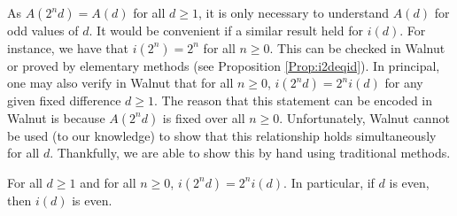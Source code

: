 \documentclass[10pt,a4paper,reqno]{amsart}
\newcommand{\walnut}{{\ttfamily Walnut}}
\newcommand{\true}{{\ttfamily TRUE}}
\begin{document}
As $A(2^nd)=A(d)$ for all $d \geq 1$, it is only necessary to understand $A(d)$ for odd values of $d$. It would be convenient if a similar result held for $i(d)$. For instance, we have that $i(2^n)=2^n$ for all $n\geq 0$. This can be checked in \walnut{} or proved by elementary methods (see Proposition \ref{Prop:i2deqid}).
%
In principal, one may also verify in \walnut{} that for all $n \geq 0$, $i(2^nd)=2^ni(d)$ for any given fixed difference $d \geq 1$. The reason that this statement can be encoded in \walnut{} is because $A(2^nd)$ is fixed over all $n \geq 0$. Unfortunately, \walnut{} cannot be used (to our knowledge) to show that this relationship holds simultaneously for all $d$. Thankfully, we are able to show this by hand using traditional methods.
\begin{prop}\label{Prop:i2deqid}
For all $d \geq 1$ and for all $n \geq 0$, $i(2^nd)=2^ni(d)$. In particular, if $d$ is even, then $i(d)$ is even.
\end{prop}
\end{document}
